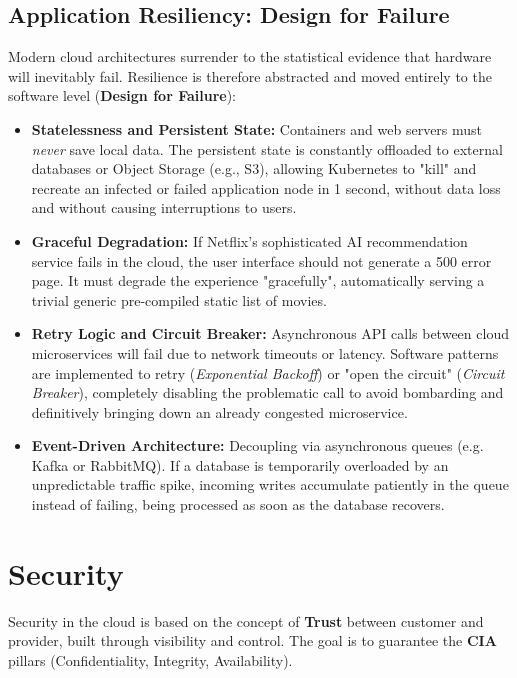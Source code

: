 \subsection{Application Resiliency: Design for Failure}
Modern cloud architectures surrender to the statistical evidence that hardware will inevitably fail. Resilience is therefore abstracted and moved entirely to the software level (\textbf{Design for Failure}):
\begin{itemize}
    \item \textbf{Statelessness and Persistent State:} Containers and web servers must \textit{never} save local data. The persistent state is constantly offloaded to external databases or Object Storage (e.g., S3), allowing Kubernetes to "kill" and recreate an infected or failed application node in 1 second, without data loss and without causing interruptions to users.
    \item \textbf{Graceful Degradation:} If Netflix's sophisticated AI recommendation service fails in the cloud, the user interface should not generate a 500 error page. It must degrade the experience "gracefully", automatically serving a trivial generic pre-compiled static list of movies.
    \item \textbf{Retry Logic and Circuit Breaker:} Asynchronous API calls between cloud microservices will fail due to network timeouts or latency. Software patterns are implemented to retry (\textit{Exponential Backoff}) or "open the circuit" (\textit{Circuit Breaker}), completely disabling the problematic call to avoid bombarding and definitively bringing down an already congested microservice.
    \item \textbf{Event-Driven Architecture:} Decoupling via asynchronous queues (e.g. Kafka or RabbitMQ). If a database is temporarily overloaded by an unpredictable traffic spike, incoming writes accumulate patiently in the queue instead of failing, being processed as soon as the database recovers.
\end{itemize}

\section{Security}
Security in the cloud is based on the concept of \textbf{Trust} between customer and provider, built through visibility and control. The goal is to guarantee the \textbf{CIA} pillars (Confidentiality, Integrity, Availability).

